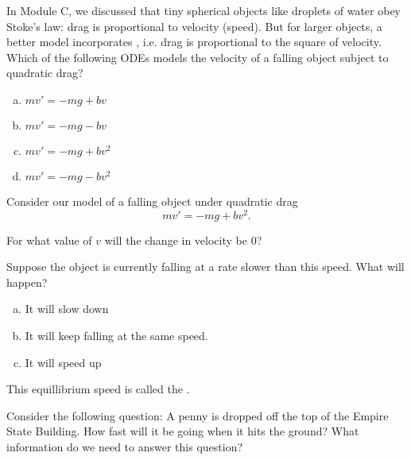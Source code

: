 \begin{applicationActivities}


\begin{activity}{5}
In Module C, we discussed that tiny spherical objects like droplets of water obey Stoke's law: drag is proportional to velocity (speed).  But for larger objects, a better model incorporates , i.e. drag is proportional to the square of velocity.
\vfill
Which of the following ODEs models the velocity of a falling object subject to quadratic drag?
\begin{enumerate}[(a)]
\item \(mv'=-mg+bv\)
\item \(mv'=-mg-bv\)
\item \(mv'=-mg+bv^2\)
\item \(mv'=-mg-bv^2\)
\end{enumerate}
\end{activity}

\begin{activity}{10}
Consider our model of a falling object under quadratic drag \[mv'=-mg+bv^2.\]

\begin{subactivity}
For what value of \(v\) will the change in velocity be \(0\)?
\end{subactivity}
\begin{subactivity}
Suppose the object is currently falling at a rate slower than this speed.  What will happen?
\begin{enumerate}[(a)]
\item It will slow down
\item It will keep falling at the same speed.
\item It will speed up
\end{enumerate}
\end{subactivity}
\end{activity}

\begin{observation}
This equillibrium speed is called the .
\end{observation}

\begin{activity}{5}
Consider the following question:
\vfill
A penny is dropped off the top of the Empire State Building.  How fast will it be going when it hits the ground?
\vfill
What information do we need to answer this question?
\end{activity}


\end{applicationActivities}
